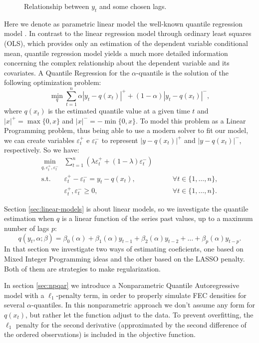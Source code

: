 \begin{figure}
\begin{minipage}[t]{0.45\linewidth}
\begin{minipage}[b]{\linewidth}
    \end{minipage}
  \end{minipage}
  \caption{Relationship between $y_t$ and some chosen lags.}
  \label{lags-icaraizinho}
\end{figure}

Here we denote as parametric linear model the well-known quantile regression model \cite{koenker2005quantile}. In contrast to the linear regression model through ordinary least squares (OLS), which provides only an estimation of the dependent variable conditional mean, quantile regression model yields a much more detailed information concerning the complex relationship about the dependent variable and its covariates. A Quantile Regression for the $\alpha$-quantile is the solution of the following optimization problem:
\begin{equation}
\min_{q}\sum_{t=1}^{n}\alpha|y_{t}-q(x_t)|^{+}+(1-\alpha)|y_{t}-q(x_t)|^{-},
\label{eq:linear-model}
\end{equation}
where $q(x_t)$ is the estimated quantile value at a given time $t$ and $|x|^+=\max\{0,x\}$ and $|x|^-=-\min\{0,x\}$. To model this problem as a Linear Programming problem, thus being able to use a modern solver to fit our model,  we can create variables $\varepsilon^+_t$ e $\varepsilon^-_t$ to represent $|y-q(x_t)|^+$ and $|y-q(x_t)|^-$, respectively. So we have:
\begin{equation}
\begin{aligned}\min_{q,\varepsilon_{t}^{+}, \varepsilon_{t}^{-}} & \sum_{t=1}^{n}\left(\lambda\varepsilon_{t}^{+}+(1-\lambda)\varepsilon_{t}^{-}\right) & \\
\mbox{s.t. } & \varepsilon_{t}^{+}-\varepsilon_{t}^{-}=y_{t}-q(x_{t}), & \qquad\forall t \in \{1,\dots,n\},\\
& \varepsilon_t^+,\varepsilon_t^- \geq 0, & \qquad \forall t \in \{1,\dots,n\}.
\end{aligned}
\label{eq:qar-general}
\end{equation}

Section \ref{sec:linear-models} is about linear models, so we investigate the quantile estimation when $q$ is a linear function of the series past values, up to a maximum number of lags $p$:
\begin{equation}
	q(y_t, \alpha; \beta) = \beta_0(\alpha) + \beta_1(\alpha)y_{t-1} + \beta_2(\alpha)y_{t-2} + \dots + \beta_p(\alpha) y_{t-p}.
	\label{eq:ft-qar}
\end{equation}
In that section we investigate two ways of estimating coeficients, one based on Mixed Integer Programming ideas and the other based on the LASSO \cite{tibshirani1996regression} penalty. Both of them are strategies to make regularization.

In section \ref{sec:npqar} we introduce a Nonparametric Quantile Autoregressive model with a $\ell_{1}$-penalty term, in order to properly simulate FEC densities for several $\alpha$-quantiles. In this nonparametric approach we don't assume any form for $q(x_t)$, but rather let the function adjust to the data. To prevent overfitting, the $\ell_1$ penalty for the second derivative (approximated by the second difference of the ordered observations) is included in the objective function.